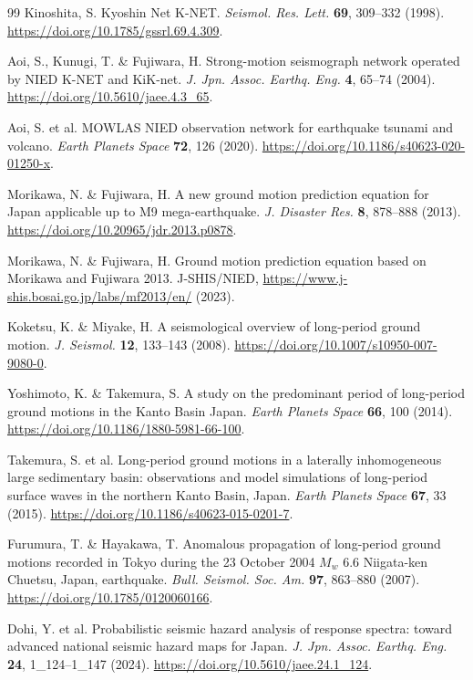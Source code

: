 \documentclass[11pt]{article}
\begin{document}
\begin{thebibliography}{99}
 Kinoshita, S. Kyoshin Net K-NET. \textit{Seismol. Res. Lett.} \textbf{69}, 309--332 (1998). \url{https://doi.org/10.1785/gssrl.69.4.309}.

 Aoi, S., Kunugi, T. \& Fujiwara, H. Strong-motion seismograph network operated by NIED K-NET and KiK-net. \textit{J. Jpn. Assoc. Earthq. Eng.} \textbf{4}, 65--74 (2004). \url{https://doi.org/10.5610/jaee.4.3_65}.

 Aoi, S. et al. MOWLAS NIED observation network for earthquake tsunami and volcano. \textit{Earth Planets Space} \textbf{72}, 126 (2020). \url{https://doi.org/10.1186/s40623-020-01250-x}.

 Morikawa, N. \& Fujiwara, H. A new ground motion prediction equation for Japan applicable up to M9 mega-earthquake. \textit{J. Disaster Res.} \textbf{8}, 878--888 (2013). \url{https://doi.org/10.20965/jdr.2013.p0878}.

 Morikawa, N. \& Fujiwara, H. Ground motion prediction equation based on Morikawa and Fujiwara 2013. J-SHIS/NIED, \url{https://www.j-shis.bosai.go.jp/labs/mf2013/en/} (2023).

 Koketsu, K. \& Miyake, H. A seismological overview of long-period ground motion. \textit{J. Seismol.} \textbf{12}, 133--143 (2008). \url{https://doi.org/10.1007/s10950-007-9080-0}.

 Yoshimoto, K. \& Takemura, S. A study on the predominant period of long-period ground motions in the Kanto Basin Japan. \textit{Earth Planets Space} \textbf{66}, 100 (2014). \url{https://doi.org/10.1186/1880-5981-66-100}.

 Takemura, S. et al. Long-period ground motions in a laterally inhomogeneous large sedimentary basin: observations and model simulations of long-period surface waves in the northern Kanto Basin, Japan. \textit{Earth Planets Space} \textbf{67}, 33 (2015). \url{https://doi.org/10.1186/s40623-015-0201-7}.

 Furumura, T. \& Hayakawa, T. Anomalous propagation of long-period ground motions recorded in Tokyo during the 23 October 2004 $M_w$ 6.6 Niigata-ken Chuetsu, Japan, earthquake. \textit{Bull. Seismol. Soc. Am.} \textbf{97}, 863--880 (2007). \url{https://doi.org/10.1785/0120060166}.

 Dohi, Y. et al. Probabilistic seismic hazard analysis of response spectra: toward advanced national seismic hazard maps for Japan. \textit{J. Jpn. Assoc. Earthq. Eng.} \textbf{24}, 1\_124--1\_147 (2024). \url{https://doi.org/10.5610/jaee.24.1_124}.


\end{thebibliography}
\end{document}
